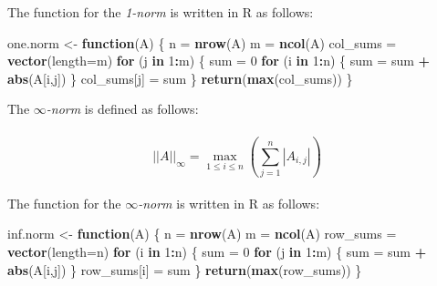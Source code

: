 \documentclass[
]{article}
\newenvironment{Shaded}{\begin{snugshade}}{\end{snugshade}}
\newcommand{\ControlFlowTok}[1]{\textcolor[rgb]{0.13,0.29,0.53}{\textbf{#1}}}
\newcommand{\DataTypeTok}[1]{\textcolor[rgb]{0.13,0.29,0.53}{#1}}
\newcommand{\DecValTok}[1]{\textcolor[rgb]{0.00,0.00,0.81}{#1}}
\newcommand{\KeywordTok}[1]{\textcolor[rgb]{0.13,0.29,0.53}{\textbf{#1}}}
\newcommand{\NormalTok}[1]{#1}
\newcommand{\OperatorTok}[1]{\textcolor[rgb]{0.81,0.36,0.00}{\textbf{#1}}}
\newcommand{\StringTok}[1]{\textcolor[rgb]{0.31,0.60,0.02}{#1}}
\begin{document}
The function for the \emph{1-norm} is written in R as follows:

\begin{Shaded}
\begin{Highlighting}[]
\NormalTok{one.norm \textless{}{-}}\StringTok{ }\ControlFlowTok{function}\NormalTok{(A) \{}
\NormalTok{  n =}\StringTok{ }\KeywordTok{nrow}\NormalTok{(A)}
\NormalTok{  m =}\StringTok{ }\KeywordTok{ncol}\NormalTok{(A)}
\NormalTok{  col\_sums =}\StringTok{ }\KeywordTok{vector}\NormalTok{(}\DataTypeTok{length=}\NormalTok{m)}
  \ControlFlowTok{for}\NormalTok{ (j }\ControlFlowTok{in} \DecValTok{1}\OperatorTok{:}\NormalTok{m) \{}
\NormalTok{    sum =}\StringTok{ }\DecValTok{0}
    \ControlFlowTok{for}\NormalTok{ (i }\ControlFlowTok{in} \DecValTok{1}\OperatorTok{:}\NormalTok{n) \{}
\NormalTok{      sum =}\StringTok{ }\NormalTok{sum }\OperatorTok{+}\StringTok{ }\KeywordTok{abs}\NormalTok{(A[i,j])}
\NormalTok{    \}}
\NormalTok{    col\_sums[j] =}\StringTok{ }\NormalTok{sum}
\NormalTok{  \}}
  \KeywordTok{return}\NormalTok{(}\KeywordTok{max}\NormalTok{(col\_sums))}
\NormalTok{\}}
\end{Highlighting}
\end{Shaded}

The \emph{\(\infty\)-norm} is defined as follows:

\hypertarget{a_infty-displaystyle-max_1-le-i-le-nsum_j1na_ij}{%
\paragraph{\texorpdfstring{\[||A||_{\infty} = \displaystyle \max_{1 \le i \le  n}(\sum_{j=1}^{n}|A_{i,j}|)\]}{\textbar\textbar A\textbar\textbar\_\{\textbackslash infty\} = \textbackslash displaystyle \textbackslash max\_\{1 \textbackslash le i \textbackslash le  n\}(\textbackslash sum\_\{j=1\}\^{}\{n\}\textbar A\_\{i,j\}\textbar)}}\label{a_infty-displaystyle-max_1-le-i-le-nsum_j1na_ij}}

The function for the \emph{\(\infty\)-norm} is written in R as follows:

\begin{Shaded}
\begin{Highlighting}[]
\NormalTok{inf.norm \textless{}{-}}\StringTok{ }\ControlFlowTok{function}\NormalTok{(A) \{}
\NormalTok{  n =}\StringTok{ }\KeywordTok{nrow}\NormalTok{(A)}
\NormalTok{  m =}\StringTok{ }\KeywordTok{ncol}\NormalTok{(A)}
\NormalTok{  row\_sums =}\StringTok{ }\KeywordTok{vector}\NormalTok{(}\DataTypeTok{length=}\NormalTok{n)}
  \ControlFlowTok{for}\NormalTok{ (i }\ControlFlowTok{in} \DecValTok{1}\OperatorTok{:}\NormalTok{n) \{}
\NormalTok{    sum =}\StringTok{ }\DecValTok{0}
    \ControlFlowTok{for}\NormalTok{ (j }\ControlFlowTok{in} \DecValTok{1}\OperatorTok{:}\NormalTok{m) \{}
\NormalTok{      sum =}\StringTok{ }\NormalTok{sum }\OperatorTok{+}\StringTok{ }\KeywordTok{abs}\NormalTok{(A[i,j])}
\NormalTok{    \}}
\NormalTok{    row\_sums[i] =}\StringTok{ }\NormalTok{sum}
\NormalTok{  \}}
  \KeywordTok{return}\NormalTok{(}\KeywordTok{max}\NormalTok{(row\_sums))}
\NormalTok{\}}
\end{Highlighting}
\end{Shaded}
\end{document}
